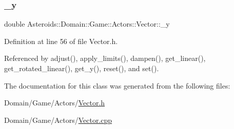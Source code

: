 \mbox{\label{classAsteroids_1_1Domain_1_1Game_1_1Actors_1_1Vector_a78c9c431c461fbe39be37c393c7fe1ba}} 
\subsubsection{\texorpdfstring{\+\_\+y}{\_y}}
{\footnotesize\ttfamily double Asteroids\+::\+Domain\+::\+Game\+::\+Actors\+::\+Vector\+::\+\_\+y\hspace{0.3cm}{\ttfamily [private]}}



Definition at line 56 of file Vector.\+h.



Referenced by adjust(), apply\+\_\+limits(), dampen(), get\+\_\+linear(), get\+\_\+rotated\+\_\+linear(), get\+\_\+y(), reset(), and set().



The documentation for this class was generated from the following files\+:\begin{DoxyCompactItemize}
\item 
Domain/\+Game/\+Actors/\hyperlink{Vector_8h}{Vector.\+h}\item 
Domain/\+Game/\+Actors/\hyperlink{Vector_8cpp}{Vector.\+cpp}\end{DoxyCompactItemize}
